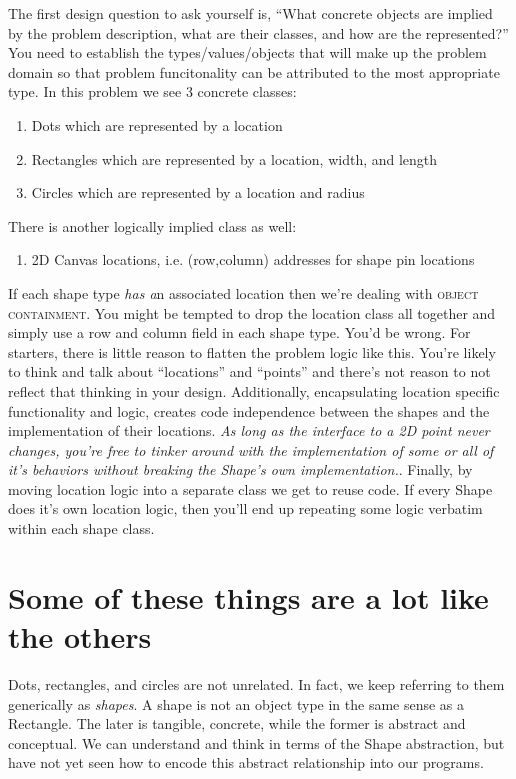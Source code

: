 \documentclass[nobib]{tufte-handout}
\begin{document}
The first design question to ask yourself is, ``What concrete objects are implied by the problem description, what are their classes, and how are the represented?'' You need to establish the types/values/objects that will make up the problem domain so that problem funcitonality can be attributed to the most appropriate type. In this problem we see 3 concrete classes:
\begin{enumerate}
\item Dots which are represented by a location
\item Rectangles which are represented by a location, width, and length
\item Circles which are represented by a location and radius
\end{enumerate}
There is another logically implied class as well:
\begin{enumerate}
\item 2D Canvas locations, i.e. (row,column) addresses for shape pin locations
\end{enumerate}

If each shape type \textit{has a}n associated location then we're dealing with \textsc{object containment}. You might be tempted to drop the location class all together and simply use a row and column field in each shape type. You'd be wrong. For starters, there is little reason to flatten the problem logic like this. You're likely to think and talk about ``locations'' and ``points'' and there's not reason to not reflect that thinking in your design. Additionally, encapsulating location specific functionality and logic, creates code independence between the shapes and the implementation of their locations. \textit{As long as the interface to a 2D point never changes, you're free to tinker around with the implementation of some or all of it's behaviors without breaking the Shape's own implementation.}. Finally, by moving location logic into a separate class we get to reuse code. If every Shape does it's own location logic, then you'll end up repeating some logic verbatim within each shape class.

\section{Some of these things are a lot like the others}

Dots, rectangles, and circles are not unrelated. In fact, we keep referring to them generically as \textit{shapes}.  A shape is not an object type in the same sense as a Rectangle. The later is tangible, concrete, while the former is abstract and conceptual. We can understand and think in terms of the Shape abstraction, but have not yet seen how to encode this abstract relationship into our programs.
\end{document}
